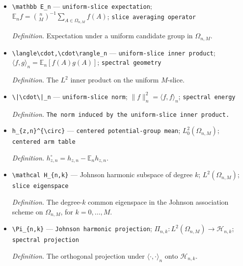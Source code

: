 \documentclass{article}
\begin{document}
\begin{itemize}
  \par\smallskip\noindent\emph{Definition.} \(h_{z,n}(A)=M^{-1}\sum_{i\in A}Y_{i,n}(z,A)\).
  \item \texttt{\textbackslash{}\allowbreak{}mathbb E\_\allowbreak{}n} --- \texttt{uniform-\allowbreak{}slice expectation}; \(\mathbb E_n f=\binom nM^{-1}\sum_{A\in\Omega_{n,M}}f(A)\); \texttt{slice averaging operator}
  \par\smallskip\noindent\emph{Definition.} Expectation under a uniform candidate group in \(\Omega_{n,M}\).
  \item \texttt{\textbackslash{}\allowbreak{}langle\textbackslash{}\allowbreak{}cdot,\allowbreak{}\textbackslash{}\allowbreak{}cdot\textbackslash{}\allowbreak{}rangle\_\allowbreak{}n} --- \texttt{uniform-\allowbreak{}slice inner product}; \(\langle f,g\rangle_n=\mathbb E_n[f(A)g(A)]\); \texttt{spectral geometry}
  \par\smallskip\noindent\emph{Definition.} The \(L^2\) inner product on the uniform \(M\)-slice.
  \item \texttt{\textbackslash{}\allowbreak{}|\textbackslash{}\allowbreak{}cdot\textbackslash{}\allowbreak{}|\_\allowbreak{}n} --- \texttt{uniform-\allowbreak{}slice norm}; \(\|f\|_n^2=\langle f,f\rangle_n\); \texttt{spectral energy}
  \par\smallskip\noindent\emph{Definition.} \texttt{The norm induced by the uniform-\allowbreak{}slice inner product.}
  \item \texttt{h\_\allowbreak{}\{z,\allowbreak{}n\}\allowbreak{}\textasciicircum{}\{\textbackslash{}\allowbreak{}circ\}\allowbreak{}} --- \texttt{centered potential-\allowbreak{}group mean}; \(L^2_0(\Omega_{n,M})\); \texttt{centered arm table}
  \par\smallskip\noindent\emph{Definition.} \(h_{z,n}^{\circ}=h_{z,n}-\mathbb E_n h_{z,n}\).
  \item \texttt{\textbackslash{}\allowbreak{}mathcal H\_\allowbreak{}\{n,\allowbreak{}k\}\allowbreak{}} --- Johnson harmonic subspace of degree \(k\); \(L^2(\Omega_{n,M})\); \texttt{slice eigenspace}
  \par\smallskip\noindent\emph{Definition.} The degree-\(k\) common eigenspace in the Johnson association scheme on \(\Omega_{n,M}\), for \(k=0,\ldots,M\).
  \item \texttt{\textbackslash{}\allowbreak{}Pi\_\allowbreak{}\{n,\allowbreak{}k\}\allowbreak{}} --- \texttt{Johnson harmonic projection}; \(\Pi_{n,k}:L^2(\Omega_{n,M})\to\mathcal H_{n,k}\); \texttt{spectral projection}
  \par\smallskip\noindent\emph{Definition.} The orthogonal projection under \(\langle\cdot,\cdot\rangle_n\) onto \(\mathcal H_{n,k}\).

\end{itemize}
\end{document}

